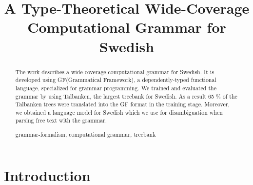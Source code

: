 \documentclass[runningheads,a4paper]{llncs}
\newcommand{\keywords}[1]{\par\addvspace\baselineskip
\noindent\keywordname\enspace\ignorespaces#1}
\begin{document}
\mainmatter  %

\title{A Type-Theoretical Wide-Coverage Computational Grammar for Swedish}

\author{}
\institute{}


\maketitle


\begin{abstract}
The work describes a wide-coverage computational grammar for Swedish. 
It is developed using GF(Grammatical Framework), a dependently-typed 
functional language, specialized for grammar programming. We trained
and evaluated the grammar by using Talbanken, the largest treebank for 
Swedish. As a result 65 $\%$ of the Talbanken trees were translated
into the GF format in the training stage. Moreover, we obtained a language
model for Swedish which we use for disambiguation when parsing free text
with the grammar. 
\keywords{grammar-formalism, computational grammar, treebank}
\end{abstract}


\section{Introduction}



\end{document}

